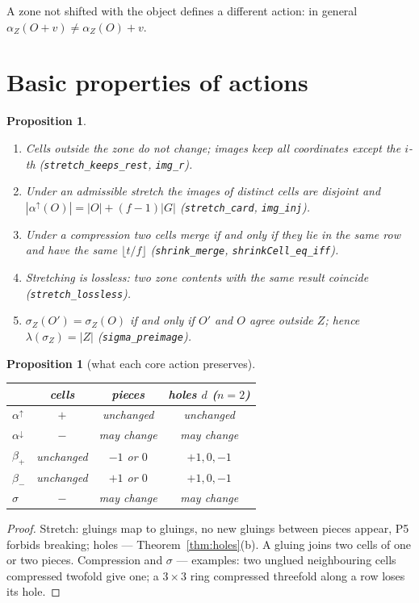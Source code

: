 \documentclass[11pt,a4paper]{article}
\theoremstyle{plain}
\newtheorem{proposition}[theorem]{Proposition}
\theoremstyle{definition}
\theoremstyle{remark}
\newcommand{\lean}[1]{\texttt{#1}}
\begin{document}
A zone not shifted with the object defines a different action: in general $\alpha_Z(O+v)\neq\alpha_Z(O)+v$.

\section{Basic properties of actions}\label{sec:props}

\begin{proposition}\label{prop:basic}
\begin{enumerate}[label=\upshape(\alph*)]
\item Cells outside the zone do not change; images keep all coordinates except the $i$-th (\lean{stretch\_keeps\_rest}, \lean{img\_r}).
\item Under an admissible stretch the images of distinct cells are disjoint and $|\alpha^\uparrow(O)|=|O|+(f-1)|G|$ (\lean{stretch\_card}, \lean{img\_inj}).
\item Under a compression two cells merge if and only if they lie in the same row and have the same $\lfloor t/f\rfloor$ (\lean{shrink\_merge}, \lean{shrinkCell\_eq\_iff}).
\item Stretching is lossless: two zone contents with the same result coincide (\lean{stretch\_lossless}).
\item $\sigma_Z(O')=\sigma_Z(O)$ if and only if $O'$ and $O$ agree outside $Z$; hence $\lambda(\sigma_Z)=|Z|$ (\lean{sigma\_preimage}).
\end{enumerate}
\end{proposition}

\begin{proposition}[what each core action preserves]
\begin{center}
\begin{tabular}{lccc}
\toprule
& cells & pieces & holes $d$ ($n=2$)\\
\midrule
$\alpha^\uparrow$ & $+$ & unchanged & unchanged\\
$\alpha^\downarrow$ & $-$ & may change & may change\\
$\beta_+$ & unchanged & $-1$ or $0$ & $+1,0,-1$\\
$\beta_-$ & unchanged & $+1$ or $0$ & $+1,0,-1$\\
$\sigma$ & $-$ & may change & may change\\
\bottomrule
\end{tabular}
\end{center}
\end{proposition}
\begin{proof}
Stretch: gluings map to gluings, no new gluings between pieces appear, P5 forbids breaking; holes — Theorem~\ref{thm:holes}(b). A gluing joins two cells of one or two pieces. Compression and $\sigma$ — examples: two unglued neighbouring cells compressed twofold give one; a $3\times3$ ring compressed threefold along a row loses its hole.
\end{proof}
\end{document}
